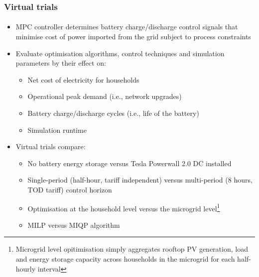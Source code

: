 \documentclass[handout, smaller, xcolor=table]{beamer}			%
\begin{document}
\begin{frame}
	\frametitle{Virtual trials}
	\framesubtitle{}

	\begin{itemize}
		\item  MPC controller determines battery charge/discharge control signals that minimise cost of power imported from the grid subject to process constraints
		
		\item  Evaluate optimisation algorithms, control techniques and simulation parameters by their effect on:
		\begin{itemize}
			\item  Net cost of electricity for households
			\item  Operational peak demand (i.e., network upgrades)
			\item  Battery charge/discharge cycles (i.e., life of the battery)
			\item  Simulation runtime
		\end{itemize}
		
		\item  Virtual trials compare:
		\begin{itemize}
			\item  No battery energy storage versus Tesla Powerwall 2.0 DC installed
			\item  Single-period (half-hour, tariff independent) versus multi-period (8 hours, TOD tariff) control horizon
			\item  Optimisation at the household level versus the microgrid level\footnote{\scriptsize Microgrid level opitimisation simply aggregates rooftop PV generation, load and energy storage capacity across households in the microgrid for each half-hourly interval
			}
			\item  MILP versus MIQP algorithm
		\end{itemize}
	
	\end{itemize}

\end{frame}
\end{document}
